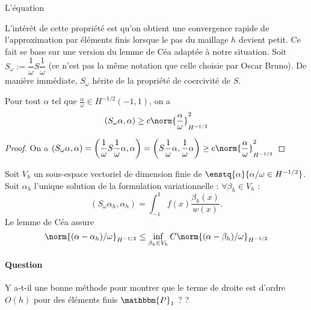 \documentclass[11pt,a4paper]{article}
\begin{document}
\begin{Rem} L'équation 
\end{Rem}

L'intérêt de cette propriété est qu'on obtient une convergence rapide de l'approximation par éléments finis lorsque le pas du maillage $h$ devient petit. Ce fait se base sur une version du lemme de Céa adaptée à notre situation.
Soit $S_{\omega} := \dfrac{1}{\omega}S\dfrac{1}{\omega}$ (ce n'est pas la même notation que celle choisie par Oscar Bruno). De manière immédiate, $S_\omega$ hérite de la propriété de coercivité de $S$. 
\begin{Prop} Pour tout $\alpha$ tel que $\frac{\alpha}{\omega} \in H^{-1/2}(-1,1)$, on a 
\[ (S_\omega \alpha,\alpha) \geq c \norm{\frac{\alpha}{\omega}}_{H^{-1/2}}^2\] 
\begin{proof}
On a
$(S_{\omega}\alpha,\alpha) = \left(\dfrac{1}{\omega}S\dfrac{1}{\omega}\alpha , \alpha\right) = \left(S\dfrac{1}{\omega}\alpha , \dfrac{1}{\omega}\alpha\right) \geq c \norm{\dfrac{\alpha}{\omega}}_{H^{-1/2}}^2$
\end{proof}
\end{Prop}
Soit $V_h$ un sous-espace vectoriel de dimension finie de $\enstq{\alpha}{\alpha/\omega \in H^{-1/2}}$. Soit $\alpha_h$ l'unique solution de la formulation variationnelle : $\forall \beta_h \in V_h$ : 
\[(S_\omega\alpha_h,\alpha_h) = \int_{-1}^{1} f(x)\dfrac{\beta_h(x)}{w(x)}.\]
Le lemme de Céa assure 
\[\norm{(\alpha - \alpha_h)/\omega}_{H^{-1/2}} \leq \inf_{\beta_h \in V_h}C\norm{(\alpha-\beta_h)/\omega}_{H^{-1/2}}\]
\paragraph{Question} Y a-t-il une bonne méthode pour montrer que le terme de droite est d'ordre $O(h)$ pour des éléments finis $\mathbbm{P}_1$ ? ?
\end{document}
